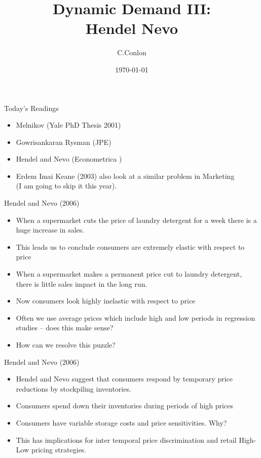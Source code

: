 \documentclass[xcolor=pdftex,dvipsnames,table,mathserif,aspectratio=169]{beamer}
\title [Dynamic Demand I]{Dynamic Demand III:\\
 Hendel Nevo}
\author{C.Conlon}
\institute{Grad IO}
\date{\today}
\begin{document}
\begin{frame}
\titlepage
\end{frame}

\begin{frame}{Today's Readings}
\begin{itemize}
\item Melnikov (Yale PhD Thesis 2001)
\item Gowrisankaran Rysman (JPE)
\item \alert{Hendel and Nevo (Econometrica )}
\item Erdem Imai Keane (2003) also look at a similar problem in Marketing\\
(I am going to skip it this year).
\end{itemize}
\end{frame}


\begin{frame}{Hendel and Nevo (2006)}
\begin{itemize}
\item When a supermarket cuts the price of laundry detergent for a week there is a huge increase in sales.
\item This leads us to conclude consumers are extremely elastic with respect to price
\item When a supermarket makes a permanent price cut to laundry detergent, there is little sales impact in the long run.
\item Now consumers look highly inelastic with respect to price
\item Often we use average prices which include high and low periods in regression studies -- does this make sense?
\item How can we resolve this puzzle?
\end{itemize}
\end{frame}

\begin{frame}{Hendel and Nevo (2006)}
\begin{itemize}
\item Hendel and Nevo suggest that consumers respond by temporary price  reductions by stockpiling inventories.
\item Consumers spend down their inventories during periods of high prices
\item Consumers have variable storage costs and price sensitivities. Why?
\item This has implications for inter temporal price discrimination and retail High-Low pricing strategies.
\end{itemize}
\end{frame}
\end{document}
